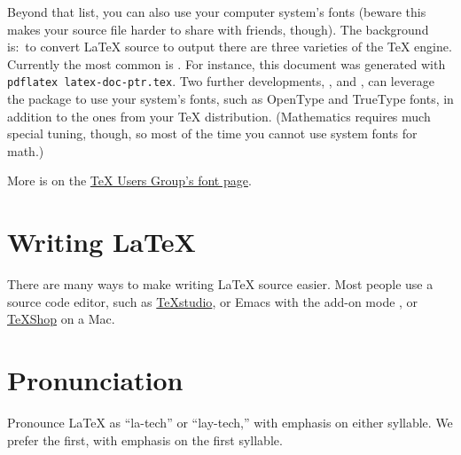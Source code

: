\documentclass[11pt]{article}
\begin{document}
\begin{multicols*}{2}
Beyond that list, you can also use your computer system's fonts
(beware this makes your source file harder to share with friends, though).
The background is:~to convert \LaTeX{} source to \PDF{} output
there are three varieties of the \TeX{} engine.
Currently the most common is 
\href{https://tug.org/applications/pdftex/}{\package{\pdfTeX}}.
For instance, this document was generated with 
\verb!pdflatex latex-doc-ptr.tex!.
Two further developments, 
\href{https://tug.org/xetex/}{\package{\XeTeX}},
and 
\href{http://www.luatex.org/}{\package{\LuaTeX}},
can leverage
the 
package to use your system's fonts,
such as OpenType and TrueType fonts,
in addition to the ones from your \TeX{} distribution.
(Mathematics requires much special tuning, though, so most
of the time you cannot use system fonts for math.)

More is on the 
\href{https://tug.org/fonts/}{\TeX{} Users Group's font page}.





\section{Writing \LaTeX{}}

There are many ways to make writing \LaTeX{} source easier.
Most people use a source code editor, such as 
\href{https://www.texstudio.org/}{\TeX{}studio}, or 
Emacs with the add-on mode 
\href{https://www.gnu.org/software/auctex/}{}, 
or \href{https://pages.uoregon.edu/koch/texshop/}{\TeX{}Shop} on
a Mac.


\section{Pronunciation}
Pronounce \LaTeX{} as
``la-tech'' or ``lay-tech,'' with emphasis on either syllable.
We prefer the first, with emphasis on the first syllable.



\end{multicols*}
\end{document}
